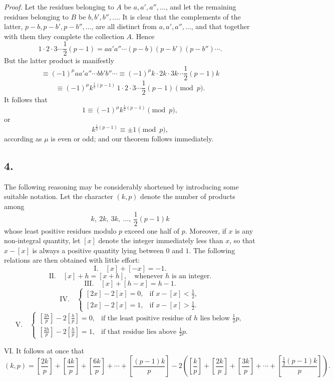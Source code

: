 \documentclass[12pt]{article}
\begin{document}
\emph{Proof.} Let the residues belonging to $A$ be $a,a',a'',\ldots$, and let the remaining residues belonging to $B$ be $b,b',b'',\ldots$. It is clear that the complements of the latter, $p-b,p-b',p-b'',\ldots$, are all distinct from $a,a',a'',\ldots$, and that together with them they complete the collection $A$. Hence
\[
1\cdot2\cdot3\cdots \frac12(p-1)
=
aa'a''\cdots(p-b)(p-b')(p-b'')\cdots .
\]
But the latter product is manifestly
\[
\equiv (-1)^\mu aa'a''\cdots bb'b''\cdots
\equiv (-1)^\mu k\cdot 2k\cdot 3k\cdots \frac12(p-1)k
\]
\[
\equiv (-1)^\mu k^{\frac12(p-1)}\,1\cdot2\cdot3\cdots\frac12(p-1)\pmod p.
\]
It follows that
\[
1\equiv (-1)^\mu k^{\frac12(p-1)}\pmod p,
\]
or
\[
k^{\frac12(p-1)}\equiv \pm1 \pmod p,
\]
according as $\mu$ is even or odd; and our theorem follows immediately.

\subsection*{4.}

The following reasoning may be considerably shortened by introducing some suitable notation. Let the character $(k,p)$ denote the number of products among
\[
k,\ 2k,\ 3k,\ \ldots,\ \frac12(p-1)k
\]
whose least positive residues modulo $p$ exceed one half of $p$. Moreover, if $x$ is any non-integral quantity, let $[x]$ denote the integer immediately less than $x$, so that $x-[x]$ is always a positive quantity lying between $0$ and $1$. The following relations are then obtained with little effort:
\[
\text{I.}\quad [x]+[-x]=-1.
\]
\[
\text{II.}\quad [x]+h=[x+h],\quad \text{whenever }h\text{ is an integer.}
\]
\[
\text{III.}\quad [x]+[h-x]=h-1.
\]
\[
\text{IV.}\quad
\begin{cases}
[2x]-2[x]=0, & \text{if }x-[x]<\frac12,\\
[2x]-2[x]=1, & \text{if }x-[x]>\frac12.
\end{cases}
\]
\[
\text{V.}\quad
\begin{cases}
\left[\frac{2h}{p}\right]-2\left[\frac{h}{p}\right]=0, & \text{if the least positive residue of }h\text{ lies below }\frac12p,\\
\left[\frac{2h}{p}\right]-2\left[\frac{h}{p}\right]=1, & \text{if that residue lies above }\frac12p.
\end{cases}
\]

VI. It follows at once that
\[
(k,p)=
\left[\frac{2k}{p}\right]+\left[\frac{4k}{p}\right]+\left[\frac{6k}{p}\right]+\cdots+\left[\frac{(p-1)k}{p}\right]
-2\left(
\left[\frac{k}{p}\right]+\left[\frac{2k}{p}\right]+\left[\frac{3k}{p}\right]+\cdots+\left[\frac{\frac12(p-1)k}{p}\right]
\right).
\]
\end{document}
